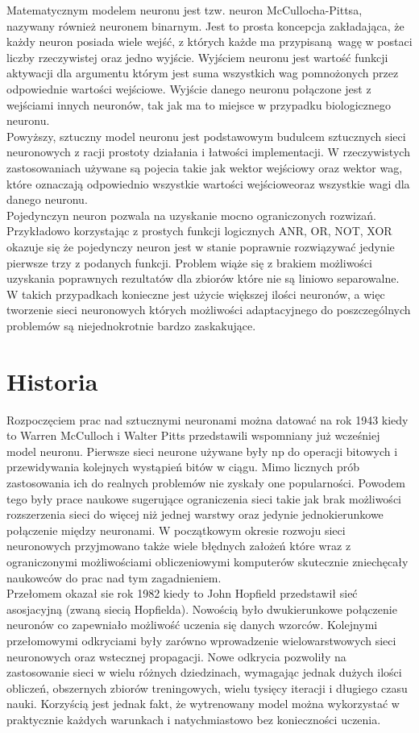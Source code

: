 Matematycznym modelem neuronu jest tzw. neuron McCullocha-Pittsa, nazywany
również neuronem binarnym. Jest to prosta koncepcja zakładająca, że każdy neuron
posiada wiele wejść, z których każde ma przypisaną wagę w postaci liczby
rzeczywistej oraz jedno wyjście. Wyjściem neuronu jest wartość funkcji aktywacji
dla argumentu którym jest suma wszystkich wag pomnożonych przez odpowiednie
wartości wejściowe. Wyjście danego neuronu połączone jest z wejściami innych
neuronów, tak jak ma to miejsce w przypadku biologicznego neuronu. \\
Powyższy, sztuczny model neuronu jest podstawowym budulcem sztucznych sieci
neuronowych z racji prostoty działania i łatwości implementacji.
W rzeczywistych zastosowaniach używane są pojecia takie jak wektor wejściowy
oraz wektor wag, które oznaczają odpowiednio wszystkie wartości wejścioweoraz
wszystkie wagi dla danego neuronu. \\
Pojedynczyn neuron pozwala na uzyskanie mocno ograniczonych rozwizań. Przykładowo
korzystając z prostych funkcji logicznych ANR, OR, NOT, XOR okazuje się że
pojedynczy neuron jest w stanie poprawnie rozwiązywać jedynie pierwsze trzy z
podanych funkcji. Problem wiąże się z brakiem możliwości uzyskania poprawnych
rezultatów dla zbiorów które nie są liniowo separowalne. W takich przypadkach
konieczne jest użycie większej ilości neuronów, a więc tworzenie sieci neuronowych
których możliwości adaptacyjnego do poszczególnych problemów są niejednokrotnie
bardzo zaskakujące.


\section{Historia}

Rozpoczęciem prac nad sztucznymi neuronami można datować na rok 1943 kiedy to
Warren McCulloch i Walter Pitts przedstawili wspomniany już wcześniej model
neuronu. Pierwsze sieci neurone używane były np do operacji bitowych i
przewidywania kolejnych wystąpień bitów w ciągu. Mimo licznych prób zastosowania
ich do realnych problemów nie zyskały one popularności. Powodem tego były prace
naukowe sugerujące ograniczenia sieci takie jak brak możliwości rozszerzenia sieci
do więcej niż jednej warstwy oraz jedynie jednokierunkowe połączenie między
neuronami. W początkowym okresie rozwoju sieci neuronowych przyjmowano także wiele
błędnych założeń które wraz z ograniczonymi możliwościami obliczeniowymi komputerów
skutecznie zniechęcały naukowców do prac nad tym zagadnieniem. \\
Przełomem okazał sie rok 1982 kiedy to John Hopfield przedstawił sieć asosjacyjną
(zwaną siecią Hopfielda). Nowością było dwukierunkowe połączenie neuronów co
zapewniało możliwość uczenia się danych wzorców. Kolejnymi przełomowymi odkryciami
były zarówno wprowadzenie wielowarstwowych sieci neuronowych oraz wstecznej
propagacji. Nowe odkrycia pozwoliły na zastosowanie sieci w wielu różnych
dziedzinach, wymagając jednak dużych ilości obliczeń, obszernych zbiorów
treningowych, wielu tysięcy iteracji i długiego czasu nauki. Korzyścią jest jednak
fakt, że wytrenowany model można wykorzystać w praktycznie każdych warunkach
i natychmiastowo bez konieczności uczenia.
